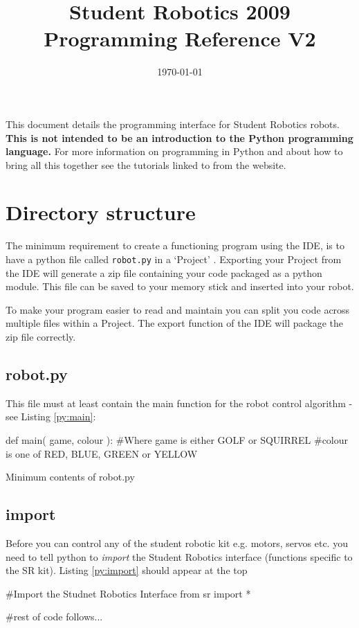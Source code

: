 \documentclass[a4paper, 12pt]{article}
\title {Student Robotics 2009\\ Programming Reference V2}
\date{\today}
\begin{document}
\maketitle

\noindent This document details the programming interface for Student Robotics
robots. {\bf This is not intended to be an introduction to the Python programming language.} For more information on programming in Python and about how to bring all this together see the tutorials linked to from the website. 

\section{Directory structure}
The minimum  requirement to create a functioning program using the IDE, is to have a python file called \texttt{robot.py} in a `Project' . Exporting your Project from the IDE will generate a zip file containing your code packaged as a python module. This file can be saved to your memory stick and inserted into your robot.

To make your program easier to read and maintain you can split you code across multiple files within a Project. The export function of the IDE will package the zip file correctly.

\subsection{robot.py}
This file must at least contain the main function for the robot control
algorithm - see Listing \ref{py:main}:

\begin{python}
\begin{verbatimtab}
def main( game, colour ):
        #Where game is either GOLF or SQUIRREL
        #colour is one of RED, BLUE, GREEN or YELLOW
\end{verbatimtab}
  \caption{\label{py:main}Minimum contents of robot.py} 
\end{python}

\subsection{import}
Before you can control any of the student robotic kit e.g. motors, servos etc. you need to tell python to \textit{import} the Student Robotics interface (functions specific to the SR kit). Listing \ref{py:import} should appear at the top
\begin{python}
\begin{verbatimtab}
#Import the Studnet Robotics Interface	
from sr import * 

#rest of code follows...
\end{verbatimtab}
  \caption{\label{py:import}} 
\end{python}
\end{document}
